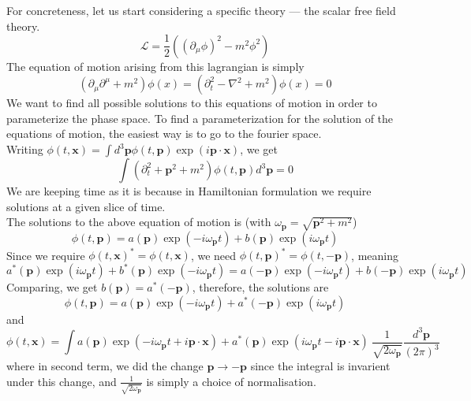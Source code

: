 \documentclass[11pt, notitlepage]{report}
\newcommand{\del}{\partial}
\newcommand{\w}{\omega}
\newcommand{\ld}{\mathcal{L}}
\numberwithin{equation}{section}
\begin{document}
    For concreteness, let us start considering a specific theory — the scalar free field theory. 
    \begin{equation}
        \ld = \frac{1}{2}\left((\del_\mu \phi)^2 - m^2\phi^2\right)
    \end{equation}
    The equation of motion arising from this lagrangian is simply 
    \begin{equation}
        (\del_\mu \del^\mu + m^2)\phi(x) = (\del_t^2 - \nabla^2 + m^2)\phi(x) = 0
    \end{equation}
    We want to find all possible solutions to this equations of motion in order to parameterize the phase space. To find a parameterization for the solution of the equations of motion, the easiest way is to go to the fourier space. \\
    Writing \(\phi(t, \textbf{x}) = \int d^3\textbf{p} \phi(t, \textbf{p})\exp(i\textbf{p}\cdot\textbf{x})\), we get 
    \begin{equation}
        \int (\del_t^2 + \textbf{p}^2 + m^2)\phi(t, \textbf{p}) d^3\textbf{p} = 0
    \end{equation}
    We are keeping time as it is because in Hamiltonian formulation we require solutions at a given slice of time. \\
    The solutions to the above equation of motion is (with \(\w_\textbf{p} = \sqrt{\textbf{p}^2 + m^2}\))
    \begin{equation}
        \phi(t,\textbf{p}) = a(\textbf{p})\exp(-i \w_\mathbf{p} t) + b(\textbf{p}) \exp(i \w_\mathbf{p} t)
    \end{equation}
    Since we require \(\phi(t, \textbf{x})^* = \phi(t, \textbf{x})\), we need 
    \(\phi(t, \textbf{p})^* = \phi(t, -\textbf{p})\), meaning
    \begin{equation*}
        a^*(\textbf{p})\exp(i \w_\mathbf{p} t) + b^*(\textbf{p}) \exp(-i \w_\mathbf{p} t) = a(-\textbf{p})\exp(-i \w_\mathbf{p} t) + b(-\textbf{p}) \exp(i \w_\mathbf{p} t)
    \end{equation*}
    Comparing, we get \(b(\textbf{p}) = a^*(-\textbf{p})\), therefore, the solutions are 
    \begin{equation}
        \phi(t, \textbf{p}) = a(\textbf{p}) \exp(-i\w_\textbf{p} t) + a^*(-\textbf{p}) \exp(i\w_\textbf{p} t)
    \end{equation}
    and 
    \begin{equation}
        \phi(t, \textbf{x}) = \int a(\textbf{p}) \exp(-i\w_\textbf{p} t + i\textbf{p}\cdot \textbf{x}) + a^*(\textbf{p}) \exp(i\w_\textbf{p} t - i\textbf{p}\cdot \textbf{x}) ~ \frac{1}{\sqrt{2\w_\textbf{p}}} \frac{d^3 \textbf{p}}{(2\pi)^3} 
    \end{equation}
    where in second term, we did the change \(\textbf{p}\to -\textbf{p}\) since the integral is invarient under this change, and \(\displaystyle\frac{1}{\sqrt{2\w_\textbf{p}}}\) is simply a choice of normalisation.\\
\end{document}
